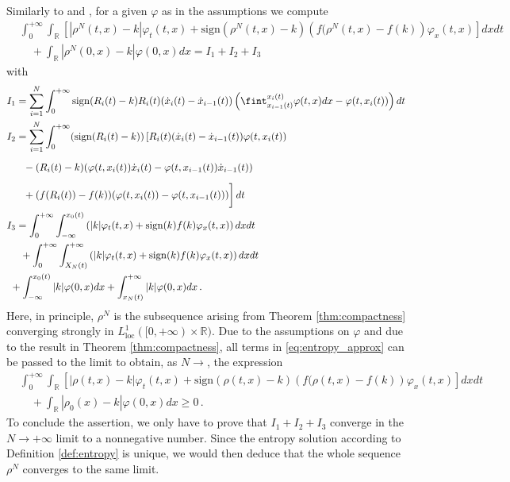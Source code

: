 \documentclass[reqno,oneside]{amsart}
\theoremstyle{plain}
\newcommand{\R}{\mathbb{R}}
\begin{document}
\proof
Similarly to \cite{DR} and \cite{DFR}, for a given $\varphi$ as in the assumptions we compute
\begin{align}
    & \int_0^{+\infty}\int_\R \left[\left|\rho^N(t,x)-k\right|\varphi_t(t,x)+\mathrm{sign}(\rho^N(t,x)-k)\left(f(\rho^N(t,x)-f(k)\right)\varphi_x(t,x)\right]dx dt\nonumber\\
         & \quad +\int_\R\left|\rho^N(0,x)-k\right|\varphi(0,x)dx= I_1 + I_2 + I_3\label{eq:entropy_approx}
\end{align}
with
\begin{align*}
        & I_1= \sum_{i=1}^N\int_0^{+\infty}\mathrm{sign}(R_i(t)-k)R_i(t)(\dot{x}_i(t)-\dot{x}_{i-1}(t))\left(\fint_{x_{i-1}(t)}^{x_i(t)}\varphi(t,x) dx-\varphi(t,x_i(t))\right)dt\\
        & I_2 =\sum_{i=1}^N\int_0^{+\infty}(\mathrm{sign}(R_i(t)-k))\left[R_i(t)(\dot{x}_i(t)-\dot{x}_{i-1}(t))\varphi(t,x_i(t))\right.\\
        & \ \quad \left.\vphantom{\int}-(R_i(t)-k)(\varphi(t,x_i(t))\dot{x}_i(t)-\varphi(t,x_{i-1}(t))\dot{x}_{i-1}(t))\right.\\
        & \ \quad \left.\vphantom{\int}+(f(R_i(t))-f(k))(\varphi(t,x_i(t))-\varphi(t,x_{i-1}(t)))\right]dt\\
        & I_3=\int_0^{+\infty}\int_{-\infty}^{x_0(t)}\left(|k|\varphi_t(t,x) +\mathrm{sign}(k)f(k)\varphi_x(t,x)\right)dx dt\\
        & \ \quad + \int_0^{+\infty}\int_{X_N(t)}^{+\infty}\left(|k|\varphi_t(t,x) +\mathrm{sign}(k)f(k)\varphi_x(t,x)\right)dx dt\\
        & \ + \int_{-\infty}^{x_0(t)}|k|\varphi(0,x) dx + \int_{x_N(t)}^{+\infty}|k|\varphi(0,x) dx\,.
\end{align*}
Here, in principle, $\rho^N$ is the subsequence arising from Theorem \ref{thm:compactness} converging strongly in $L^1_{\mathrm{loc}}([0,+\infty)\times \R)$. 
Due to the assumptions on $\varphi$ and due to the result in Theorem \ref{thm:compactness}, all terms in \eqref{eq:entropy_approx} can be passed to the limit to obtain, as $N\rightarrow$, the expression
\begin{align*}
     & \int_0^{+\infty}\int_\R \left[\left|\rho(t,x)-k\right|\varphi_t(t,x)+\mathrm{sign}(\rho(t,x)-k)\left(f(\rho(t,x)-f(k)\right)\varphi_x(t,x)\right]dx dt\nonumber\\
        & \quad +\int_\R\left|\rho_0(x)-k\right|\varphi(0,x)dx \geq 0\,.
\end{align*}
To conclude the assertion, we only have to prove that $I_1+I_2+I_3$ converge in the $N\rightarrow+\infty$ limit to a nonnegative number. Since the entropy solution according to Definition \ref{def:entropy} is unique, we would then deduce that the whole sequence $\rho^N$ converges to the same limit.
\end{document}
